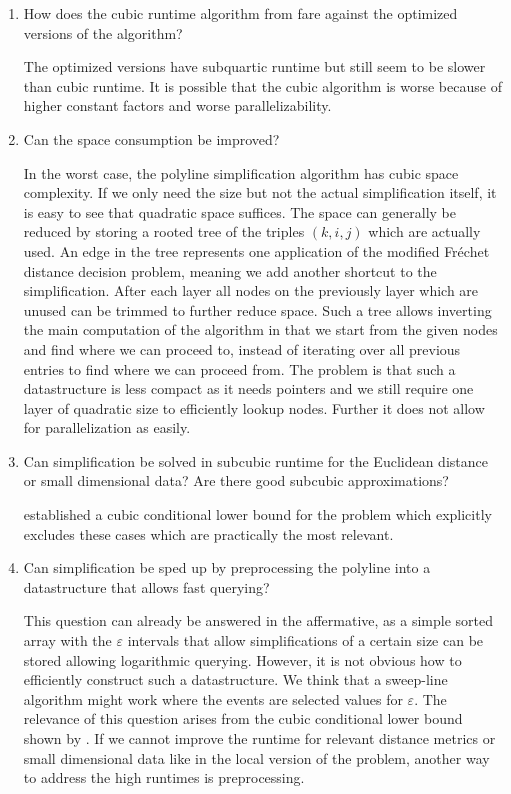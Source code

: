 \begin{enumerate}
  \item How does the cubic runtime algorithm from \citeauthor{polyline_simplification_has_cubic_complexity_bringmannetal} fare against the optimized versions of the \citeauthor{on_optimal_polyline_simplification_using_the_hausdorff_and_frechet_distance} algorithm? 

    The optimized versions have subquartic runtime but still seem to be slower than cubic runtime. It is possible that the cubic algorithm is worse because of higher constant factors and worse parallelizability. 

  \item Can the space consumption be improved? 

  In the worst case, the polyline simplification algorithm has cubic space complexity. If we only need the size but not the actual simplification itself, it is easy to see that quadratic space suffices. The space can generally be reduced by storing a rooted tree of the triples \((k, i, j)\) which are actually used. An edge in the tree represents one application of the modified Fréchet distance decision problem, meaning we add another shortcut to the simplification. After each layer all nodes on the previously layer which are unused can be trimmed to further reduce space. Such a tree allows inverting the main computation of the algorithm in that we start from the given nodes and find where we can proceed to, instead of iterating over all previous entries to find where we can proceed from. The problem is that such a datastructure is less compact as it needs pointers and we still require one layer of quadratic size to efficiently lookup nodes. Further it does not allow for parallelization as easily. 

\item Can simplification be solved in subcubic runtime for the Euclidean distance or small dimensional data? Are there good subcubic approximations?

  \citeauthor{polyline_simplification_has_cubic_complexity_bringmannetal} established a cubic conditional lower bound for the problem which explicitly excludes these cases which are practically the most relevant.

  \item Can simplification be sped up by preprocessing the polyline into a datastructure that allows fast querying?
  
	  This question can already be answered in the affermative, as a simple sorted array with the \(\varepsilon\) intervals that allow simplifications of a certain size can be stored allowing logarithmic querying. However, it is not obvious how to efficiently construct such a datastructure. We think that a sweep-line algorithm might work where the events are selected values for \(\varepsilon\). The relevance of this question arises from the cubic conditional lower bound shown by \citeauthor{polyline_simplification_has_cubic_complexity_bringmannetal}. If we cannot improve the runtime for relevant distance metrics or small dimensional data like in the local version of the problem, another way to address the high runtimes is preprocessing. 


\end{enumerate}

